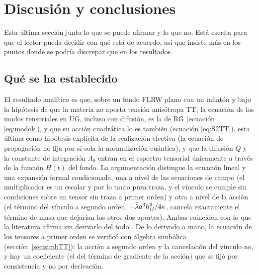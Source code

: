 \section{Discusión y conclusiones}
\label{sec:discusion}

Esta última sección junta lo que se puede afirmar y lo que no. Está escrita para que el lector pueda decidir con qué está de acuerdo, así que insiste más en los puntos donde se podría discrepar que en los resultados.

\subsection{Qué se ha establecido}

El resultado analítico es que, sobre un fondo FLRW plano con un inflatón y bajo la hipótesis de que la materia no aporta tensión anisótropa TT, la ecuación de los modos tensoriales en UG, incluso con difusión, es la de RG (ecuación \eqref{eq:modok}), y que su acción cuadrática lo es también (ecuación \eqref{eq:S2TT}), esta última como hipótesis explícita de la realización efectiva (la ecuación de propagación no fija por sí sola la normalización cuántica), y que la difusión $Q$ y la constante de integración $\Lambda_0$ entran en el espectro tensorial únicamente a través de la función $H(t)$ del fondo. La argumentación distingue la ecuación lineal y una expansión formal condicionada, una a nivel de las ecuaciones de campo (el multiplicador es un escalar y por lo tanto pura traza, y el vínculo se cumple sin condiciones sobre un tensor sin traza a primer orden) y otra a nivel de la acción (el término del vínculo a segundo orden, $+\bar\lambda a^3h_{ij}^2/4\kappa$, cancela exactamente el término de masa que dejarían los otros dos aportes). Ambas coinciden con lo que la literatura afirma sin derivarlo del todo \cite{basak16,cho15,fabris22,barvinsky19}. De lo derivado a mano, la ecuación de los tensores a primer orden se verificó con álgebra simbólica (sección~\ref{sec:simbTT}); la acción a segundo orden y la cancelación del vínculo no, y hay un coeficiente (el del término de gradiente de la acción) que se fijó por consistencia y no por derivación.

